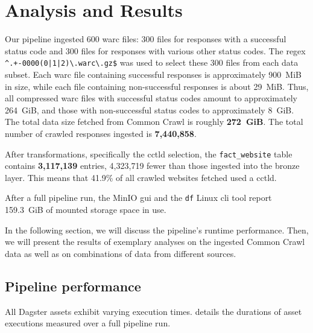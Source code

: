 \section{Analysis and Results}
\label{sec:analysis}

Our pipeline ingested 600 \ac{warc} files: 300 files for responses with a successful status code and 300 files for responses with various other status codes.
The \ac{regex} \texttt{\textasciicircum.+-0000(0|1|2)\textbackslash .warc\textbackslash .gz\$} was used to select these 300 files from each data subset.
Each \ac{warc} file containing successful responses is approximately 900~MiB in size, while each file containing non-successful responses is about 29~MiB.
Thus, all compressed \ac{warc} files with successful status codes amount to approximately 264~GiB, and those with non-successful status codes to approximately 8~GiB.
The total data size fetched from Common Crawl is roughly \textbf{272~GiB}.
The total number of crawled responses ingested is \textbf{7,440,858}.

After transformations, specifically the \ac{cctld} selection, the \texttt{fact\_website} table contains \textbf{3,117,139} entries, 4,323,719 fewer than those ingested into the bronze layer.
This means that 41.9\% of all crawled websites fetched used a \ac{cctld}.

After a full pipeline run, the MinIO \ac{gui} and the \texttt{df} Linux \ac{cli} tool report 159.3~GiB of mounted storage space in use.

In the following section, we will discuss the pipeline's runtime performance.
Then, we will present the results of exemplary analyses on the ingested Common Crawl data as well as on combinations of data from different sources.


\subsection{Pipeline performance}
\label{sec:analysis-pipeline}

All Dagster assets exhibit varying execution times.
 details the durations of asset executions measured over a full pipeline run.

